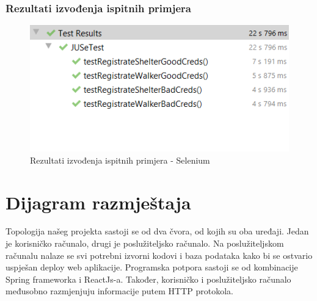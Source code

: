 		 \subsubsection{Rezultati izvođenja ispitnih primjera}
		 	\begin{figure}[H]
		 		\centerline{
		 		\includegraphics[scale=0.75]{slike/SeleniumRezultati.PNG}} %
		 		\caption{Rezultati izvođenja ispitnih primjera - Selenium}
		 		\centering
		 	\end{figure}
		 
		 
			
			\eject 
		
		
		\section{Dijagram razmještaja}
			
			
			
			 Topologija našeg projekta sastoji se od dva čvora, od kojih su oba uređaji. Jedan je korisničko računalo, drugi je poslužiteljsko računalo. Na poslužiteljskom računalu nalaze se svi potrebni izvorni kodovi i baza podataka kako bi se ostvario uspješan deploy web aplikacije. Programska potpora sastoji se od kombinacije Spring frameworka i ReactJs-a. Također, korisničko i poslužiteljsko računalo međusobno razmjenjuju informacije putem HTTP protokola.
			
